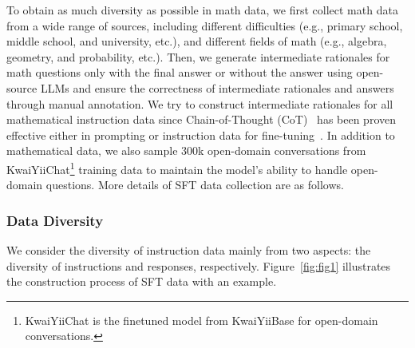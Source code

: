 \documentclass{article}
\begin{document}
To obtain as much diversity as possible in math data, we first collect math data from a wide range of sources, including different difficulties (e.g., primary school, middle school, and university, etc.), and different fields of math (e.g., algebra, geometry, and probability, etc.). 
Then, we generate intermediate rationales for math questions only with the final answer or without the answer using open-source LLMs and ensure the correctness of intermediate rationales and answers through manual annotation.
We try to construct intermediate rationales for all mathematical instruction data since Chain-of-Thought (CoT)~\cite{wei2022chain} has been proven effective either in prompting or instruction data for fine-tuning~\cite{ho2022large,zhu2022solving,li2023symbolic}. 
In addition to mathematical data, we also sample 300k open-domain conversations from KwaiYiiChat\footnote{KwaiYiiChat is the finetuned model from KwaiYiiBase for open-domain conversations.} training data to maintain the model's ability to handle open-domain questions.
More details of SFT data collection are as follows.











\subsubsection{Data Diversity}
We consider the diversity of instruction data mainly from two aspects: the diversity of instructions and responses, respectively. Figure~\ref{fig:fig1} illustrates the construction process of SFT data with an example. 
\end{document}
